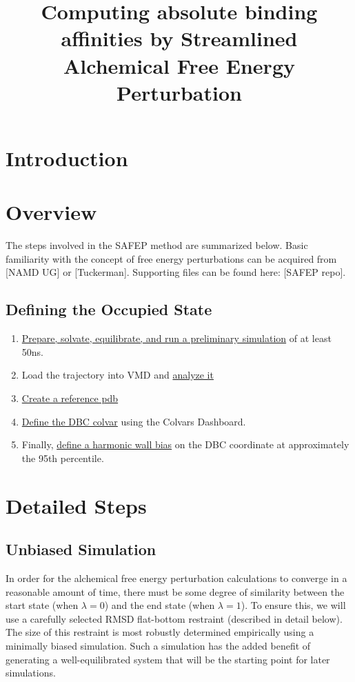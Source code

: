 \documentclass[9pt,tutorial]{Styling/livecoms}
\title{Computing absolute binding affinities by Streamlined Alchemical Free Energy Perturbation}
\begin{document}
\begin{frontmatter}
\maketitle

\begin{abstract}
\end{abstract}

\end{frontmatter}

\section{Introduction}

\section{Overview}
The steps involved in the SAFEP method are summarized below. Basic familiarity with the concept of free energy perturbations can be acquired from [NAMD UG] or [Tuckerman]. Supporting files can be found here: [SAFEP repo].\par
\subsection{Defining the Occupied State}
\begin{enumerate}
    \item \hyperref[sec:unbiased]{Prepare, solvate, equilibrate, and run a preliminary simulation} of at least 50ns. 
    \item Load the trajectory into VMD and \hyperref[sec:analyzeUnbiased]{analyze it}
    \item \hyperref[sec:referenceStructure]{Create a reference pdb} 
    \item \hyperref[sec:defineDBC]{Define the DBC colvar} using the Colvars Dashboard.
    \item Finally, \hyperref[sec:defineHarmonicWall]{define a harmonic wall bias} on the DBC coordinate at approximately the 95th percentile.
\end{enumerate}

\section{Detailed Steps}
\subsection{Unbiased Simulation}
\label{sec:unbiased}
In order for the alchemical free energy perturbation calculations to converge in a reasonable amount of time, there must be some degree of similarity between the start state (when $\lambda=0$) and the end state (when $\lambda=1$). To ensure this, we will use a carefully selected RMSD flat-bottom restraint (described in detail below). The size of this restraint is most robustly determined empirically using a minimally biased simulation. Such a simulation has the added benefit of generating a well-equilibrated system that will be the starting point for later simulations.\par
\end{document}

